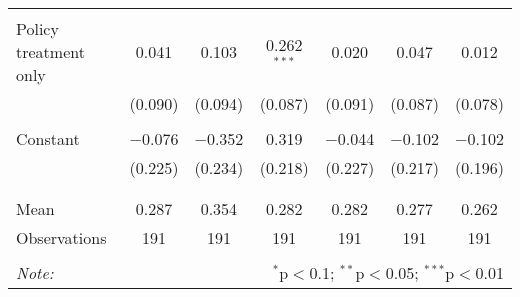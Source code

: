 \begin{tabular}{@{\extracolsep{5pt}}lcccccc}
  & & & & & & \\ 
 Policy treatment only & 0.041 & 0.103 & 0.262$^{***}$ & 0.020 & 0.047 & 0.012 \\ 
  & (0.090) & (0.094) & (0.087) & (0.091) & (0.087) & (0.078) \\ 
  & & & & & & \\ 
 Constant & $-$0.076 & $-$0.352 & 0.319 & $-$0.044 & $-$0.102 & $-$0.102 \\ 
  & (0.225) & (0.234) & (0.218) & (0.227) & (0.217) & (0.196) \\ 
  & & & & & & \\ 
\hline \\[-1.8ex] 
Mean & 0.287 & 0.354 & 0.282 & 0.282 & 0.277 & 0.262 \\ 
Observations & 191 & 191 & 191 & 191 & 191 & 191 \\ 
\hline 
\hline \\[-1.8ex] 
\textit{Note:}  & \multicolumn{6}{r}{$^{*}$p$<$0.1; $^{**}$p$<$0.05; $^{***}$p$<$0.01} \\ 
\end{tabular} 
